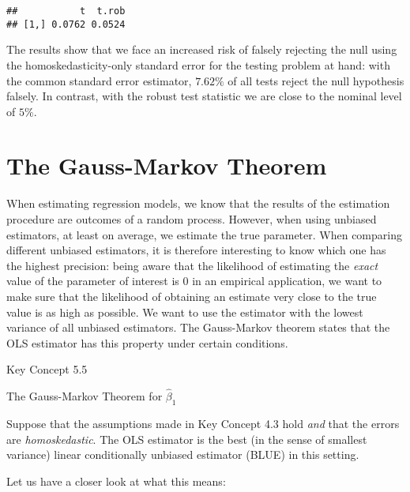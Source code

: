 \documentclass[]{book}
\theoremstyle{definition}
\theoremstyle{definition}
\theoremstyle{definition}
\theoremstyle{remark}
\begin{document}
\begin{verbatim}
##           t  t.rob
## [1,] 0.0762 0.0524
\end{verbatim}

The results show that we face an increased risk of falsely rejecting the
null using the homoskedasticity-only standard error for the testing
problem at hand: with the common standard error estimator, \(7.62\%\) of
all tests reject the null hypothesis falsely. In contrast, with the
robust test statistic we are close to the nominal level of \(5\%\).

\section{The Gauss-Markov Theorem}\label{the-gauss-markov-theorem}

When estimating regression models, we know that the results of the
estimation procedure are outcomes of a random process. However, when
using unbiased estimators, at least on average, we estimate the true
parameter. When comparing different unbiased estimators, it is therefore
interesting to know which one has the highest precision: being aware
that the likelihood of estimating the \emph{exact} value of the
parameter of interest is \(0\) in an empirical application, we want to
make sure that the likelihood of obtaining an estimate very close to the
true value is as high as possible. We want to use the estimator with the
lowest variance of all unbiased estimators. The Gauss-Markov theorem
states that the OLS estimator has this property under certain
conditions.

Key Concept 5.5

The Gauss-Markov Theorem for \(\hat{\beta}_1\)

Suppose that the assumptions made in Key Concept 4.3 hold \emph{and}
that the errors are \emph{homoskedastic}. The OLS estimator is the best
(in the sense of smallest variance) linear conditionally unbiased
estimator (BLUE) in this setting.

Let us have a closer look at what this means:
\end{document}
